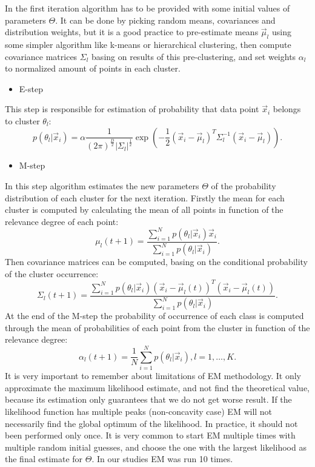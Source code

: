 \documentclass[11pt]{article}
\begin{document}
In the first iteration algorithm has to be provided with some initial values of parameters $\Theta$. It can be done by picking random means, covariances and distribution weights, but it is a good practice to pre-estimate means $\overrightarrow{\mu}_l$  using some simpler  algorithm like k-means or hierarchical clustering, then compute covariance matrices $\Sigma_l$ basing on results of this pre-clustering, and set weights $\alpha_l$ to normalized amount of points in each cluster.
 \begin{itemize}
     \item E-step
 \end{itemize}
This step is responsible for estimation of probability that  data point $\overrightarrow{x}_i$  belongs to cluster $\theta_l$:
\begin{equation}
    p(\theta_l|\overrightarrow{x}_i)=\alpha \frac{1}{(2\pi)^{\frac{D}{2}}|\Sigma_l|^{\frac{1}{2}}}\exp\left(-\frac{1}{2}(\overrightarrow{x}_i-\overrightarrow{\mu}_l)^T\Sigma_l^{-1}(\overrightarrow{x}_i-\overrightarrow{\mu}_l)\right).
\end{equation}
    \begin{itemize}
        \item M-step
    \end{itemize}
In this step algorithm estimates the new parameters $\Theta$ of the probability distribution of each cluster for the next iteration. Firstly the mean for each cluster is computed by calculating the mean of all points in function of the relevance degree of each point:
\begin{equation}
    \mu_l(t+1)=\frac{\sum_{i=1}^N p(\theta_l|\overrightarrow{x}_i)\overrightarrow{x}_i}{\sum_{i=1}^N p(\theta_l|\overrightarrow{x}_i)}.
\end{equation}
Then covariance matrices can be computed, basing on the conditional probability of the cluster occurrence:
\begin{equation}
    \Sigma_l(t+1)=\frac{\sum_{i=1}^N p(\theta_l|\overrightarrow{x}_i)(\overrightarrow{x}_i-\overrightarrow{\mu}_l(t))^T(\overrightarrow{x}_i-\overrightarrow{\mu}_l(t))}{\sum_{i=1}^N p(\theta_l|\overrightarrow{x}_i)}.
\end{equation}
At the end of the M-step the probability of occurrence of each class is computed through the mean of probabilities of each point from the cluster in function of the relevance degree:
\begin{equation}
    \alpha_l(t+1)=\frac{1}{N}\sum_{i=1}^{N}p(\theta_l|\overrightarrow{x}_i), l=1,\dots,K.
\end{equation}
It is very important to remember about limitations of EM methodology. It only approximate the maximum likelihood estimate, and not find the theoretical value, because its estimation only guarantees that we do not get worse result. If the likelihood function has multiple peaks (non-concavity case) EM will not necessarily find the global optimum of the likelihood. In practice, it should not been performed only once. It is very common to start EM multiple times with multiple random initial guesses, and choose the one with the largest likelihood as the final estimate for $\Theta$. In our studies EM was run 10 times.
%
%
\end{document}
